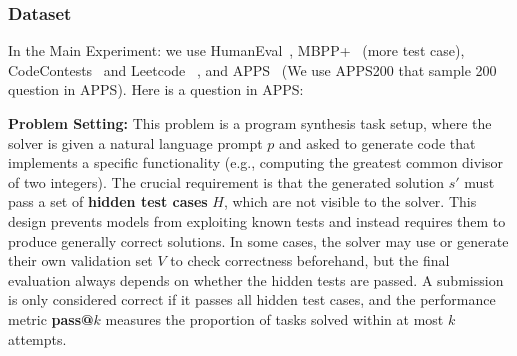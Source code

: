 \documentclass{article} %
\theoremstyle{definition}
\theoremstyle{remark}
\begin{document}
\subsubsection{Dataset}
In the Main Experiment: we use HumanEval~\citep{chen2021evaluating}, MBPP+~\citep{austin2021program} (more test case), CodeContests~\citep{doi:10.1126/science.abq1158} and Leetcode~\citep{guo2024deepseek} , and APPS~\citep{hendrycks2021measuring} (We use APPS200 that sample 200 question in APPS). Here is a question in APPS:

\textbf{Problem Setting:}
This problem is a program synthesis task setup, where the solver is given a natural language prompt $p$ and asked to generate code that implements a specific functionality (e.g., computing the greatest common divisor of two integers). The crucial requirement is that the generated solution $s'$ must pass a set of \textbf{hidden test cases} $H$, which are not visible to the solver. This design prevents models from exploiting known tests and instead requires them to produce generally correct solutions. In some cases, the solver may use or generate their own validation set $V$ to check correctness beforehand, but the final evaluation always depends on whether the hidden tests are passed. A submission is only considered correct if it passes all hidden test cases, and the performance metric \textbf{pass@$k$} measures the proportion of tasks solved within at most $k$ attempts.
\end{document}
